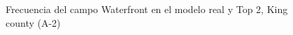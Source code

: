 \begin{figure}[H]
    \centering
    
    \caption{Frecuencia del campo Waterfront en el modelo real y Top 2, King county (A-2)}
    \label{frecuency-top2-waterfront}
\end{figure}